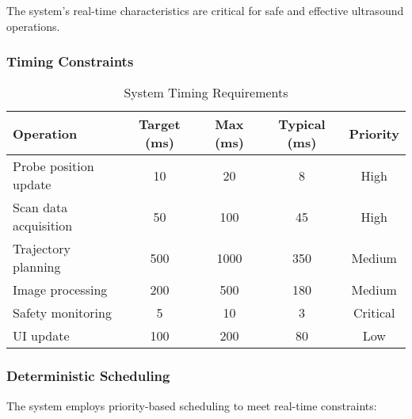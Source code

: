 The system's real-time characteristics are critical for safe and effective ultrasound operations.

\subsubsection{Timing Constraints}

\begin{table}[h]
\centering
\begin{tabular}{|l|c|c|c|c|}
\hline
\textbf{Operation} & \textbf{Target (ms)} & \textbf{Max (ms)} & \textbf{Typical (ms)} & \textbf{Priority} \\
\hline
Probe position update & 10 & 20 & 8 & High \\
Scan data acquisition & 50 & 100 & 45 & High \\
Trajectory planning & 500 & 1000 & 350 & Medium \\
Image processing & 200 & 500 & 180 & Medium \\
Safety monitoring & 5 & 10 & 3 & Critical \\
UI update & 100 & 200 & 80 & Low \\
\hline
\end{tabular}
\caption{System Timing Requirements}
\label{tab:timing_requirements}
\end{table}

\subsubsection{Deterministic Scheduling}

The system employs priority-based scheduling to meet real-time constraints:

